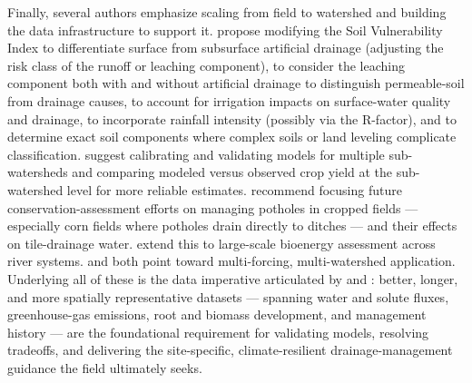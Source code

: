 \documentclass[11pt]{article}
\begin{document}
Finally, several authors emphasize scaling from field to watershed and building the data infrastructure to support it. \textcite{Baffaut2020} propose modifying the Soil Vulnerability Index to differentiate surface from subsurface artificial drainage (adjusting the risk class of the runoff or leaching component), to consider the leaching component both with and without artificial drainage to distinguish permeable-soil from drainage causes, to account for irrigation impacts on surface-water quality and drainage, to incorporate rainfall intensity (possibly via the R-factor), and to determine exact soil components where complex soils or land leveling complicate classification. \textcite{Singh2023} suggest calibrating and validating models for multiple sub-watersheds and comparing modeled versus observed crop yield at the sub-watershed level for more reliable estimates. \textcite{Smith2008} recommend focusing future conservation-assessment efforts on managing potholes in cropped fields --- especially corn fields where potholes drain directly to ditches --- and their effects on tile-drainage water. \textcite{Guo2018} extend this to large-scale bioenergy assessment across river systems. \textcite{Ferin2023} and \textcite{Deng2011} both point toward multi-forcing, multi-watershed application. Underlying all of these is the data imperative articulated by \textcite{Ma2025} and \textcite{SKAGGS1994}: better, longer, and more spatially representative datasets --- spanning water and solute fluxes, greenhouse-gas emissions, root and biomass development, and management history --- are the foundational requirement for validating models, resolving tradeoffs, and delivering the site-specific, climate-resilient drainage-management guidance the field ultimately seeks.

\printbibliography
\end{document}
